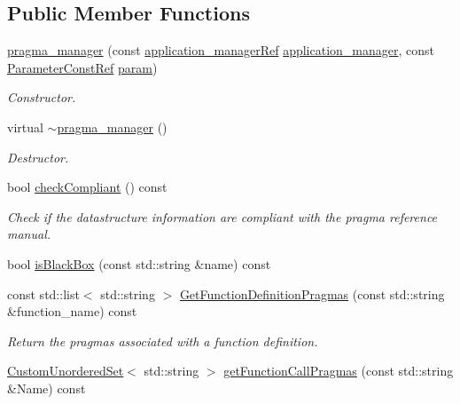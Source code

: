 \subsection*{Public Member Functions}
\begin{DoxyCompactItemize}
\item 
\hyperlink{classpragma__manager_abe4b519b37e161145fdc9b7f3eec8dc7}{pragma\+\_\+manager} (const \hyperlink{application__manager_8hpp_a04ccad4e5ee401e8934306672082c180}{application\+\_\+manager\+Ref} \hyperlink{classapplication__manager}{application\+\_\+manager}, const \hyperlink{Parameter_8hpp_a37841774a6fcb479b597fdf8955eb4ea}{Parameter\+Const\+Ref} \hyperlink{classpragma__manager_ae835ae679a5824acb0d3462dccbdc9f3}{param})
\begin{DoxyCompactList}\small\item\em Constructor. \end{DoxyCompactList}\item 
virtual \hyperlink{classpragma__manager_a33e658c5da1d379d7a8a83263c9179c6}{$\sim$pragma\+\_\+manager} ()
\begin{DoxyCompactList}\small\item\em Destructor. \end{DoxyCompactList}\item 
bool \hyperlink{classpragma__manager_a9394087bc283275fdc9209e7df1694d9}{check\+Compliant} () const
\begin{DoxyCompactList}\small\item\em Check if the datastructure information are compliant with the pragma reference manual. \end{DoxyCompactList}\item 
bool \hyperlink{classpragma__manager_ac486a3dc41a97342bb066234ba85a462}{is\+Black\+Box} (const std\+::string \&name) const
\item 
const std\+::list$<$ std\+::string $>$ \hyperlink{classpragma__manager_a0ee0e0a92fc87d1b02138648e6772c2c}{Get\+Function\+Definition\+Pragmas} (const std\+::string \&function\+\_\+name) const
\begin{DoxyCompactList}\small\item\em Return the pragmas associated with a function definition. \end{DoxyCompactList}\item 
\hyperlink{classCustomUnorderedSet}{Custom\+Unordered\+Set}$<$ std\+::string $>$ \hyperlink{classpragma__manager_a93a79077c0e60688b26c36fc10858d58}{get\+Function\+Call\+Pragmas} (const std\+::string \&Name) const
\item 

\end{DoxyCompactItemize}
